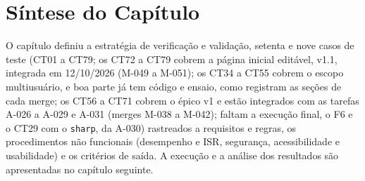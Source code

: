 
\section{Síntese do Capítulo}

O capítulo definiu a estratégia de verificação e validação, setenta e nove casos de teste (CT01 a CT79; os CT72 a CT79 cobrem a página inicial editável, v1.1, integrada em 12/10/2026 (M-049 a M-051); os CT34 a CT55 cobrem o escopo multiusuário, e boa parte já tem código e ensaio, como registram as seções de cada merge; os CT56 a CT71 cobrem o épico v1 e estão integrados com as tarefas A-026 a A-029 e A-031 (merges M-038 a M-042); faltam a execução final, o F6 e o CT29 com o \texttt{sharp}, da A-030) rastreados a requisitos e regras, os procedimentos não funcionais (desempenho e ISR, segurança, acessibilidade e usabilidade) e os critérios de saída. A execução e a análise dos resultados são apresentadas no capítulo seguinte.
